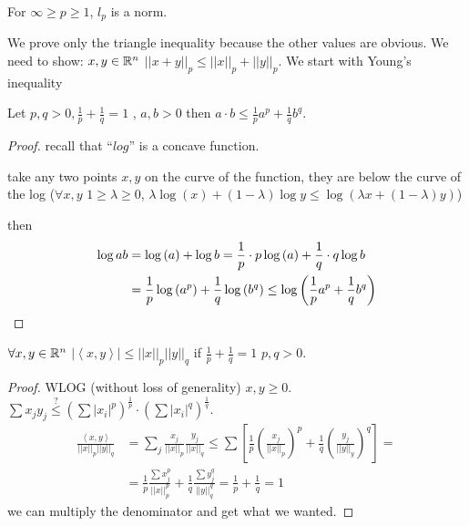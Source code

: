 \begin{claim}
For $\infty\ge p\ge1$, $l_{p}$ is a norm.

We prove only the triangle inequality because the other values are
obvious. We need to show: $x,y\in\mathbb{R}^{n}$ $\left|\left|x+y\right|\right|_{p}\le\left|\left|x\right|\right|_{p}+\left|\left|y\right|\right|_{p}$.
We start with Young's inequality
\begin{proposition}
Let $p,q>0,\frac{1}{p}+\frac{1}{q}=1$ , $a,b>0$ then $a\cdot b\le\frac{1}{p}a^{p}+\frac{1}{q}b^{q}$.
\begin{proof}
recall that ``$log$'' is a concave function. %
\begin{insight}
take any two points $x,y$ on the curve of the function, they are
below the curve of the log ($\forall x,y$ $1\ge\lambda\ge0$, $\lambda\log\left(x\right)+\left(1-\lambda\right)\log y\le\log\left(\lambda x+\left(1-\lambda\right)y\right)$)%
\end{insight}
{} then 
\begin{align*}
\log ab & =\log\left(a\right)+\log b=\frac{1}{p}\cdot p\log\left(a\right)+\frac{1}{q}\cdot q\log b\\
 & =\frac{1}{p}\log\left(a^{p}\right)+\frac{1}{q}\log\left(b^{q}\right)\le\text{\ensuremath{\log\left(\frac{1}{p}a^{p}+\frac{1}{q}b^{q}\right)}}
\end{align*}
\end{proof}
\begin{proposition}
$\forall x,y\in\mathbb{R}^{n}$ $\left|\left\langle x,y\right\rangle \right|\le\left|\left|x\right|\right|_{p}\left|\left|y\right|\right|_{q}$
if $\frac{1}{p}+\frac{1}{q}=1$ $p,q>0$.
\begin{proof}
WLOG (without loss of generality) $x,y\ge0$. $\sum x_{j}y_{j}\overset{?}{\le}\left(\sum\left|x_{i}\right|^{p}\right)^{\frac{1}{p}}\cdot\left(\sum\left|x_{i}\right|^{q}\right)^{\frac{1}{q}}$.
\begin{align*}
\frac{\left\langle x,y\right\rangle }{\left|\left|x\right|\right|_{p}\left|\left|y\right|\right|_{q}} & =\sum\limits _{j}\frac{x_{j}}{\left|\left|x\right|\right|_{p}}\frac{y_{j}}{\left|\left|x\right|\right|_{q}}\le\sum\left[\frac{1}{p}\left(\frac{x_{j}}{\left|\left|x\right|\right|_{p}}\right)^{p}+\frac{1}{q}\left(\frac{y_{j}}{\left|\left|y\right|\right|_{y}}\right)^{q}\right]=\\
 & =\frac{1}{p}\frac{\sum x_{j}^{p}}{\left|\left|x\right|\right|_{p}^{p}}+\frac{1}{q}\frac{\sum y_{j}^{q}}{\left|\left|y\right|\right|_{q}^{q}}=\frac{1}{p}+\frac{1}{q}=1
\end{align*}
 we can multiply the denominator and get what we wanted.
\end{proof}
\end{proposition}


\end{proposition}
\end{claim}
